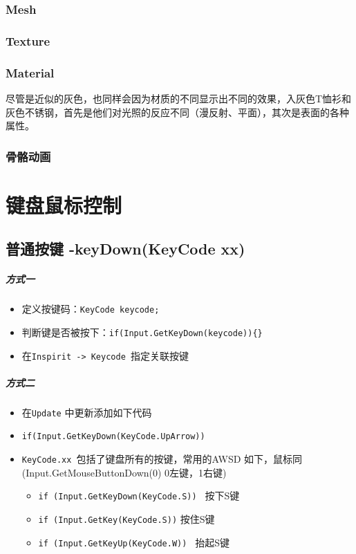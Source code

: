 \documentclass[UTF8,a4paper,12pt]{ctexbook}
\begin{document}
		\subsection{Mesh}
		
		\subsection{Texture}
				
		\subsection{Material}
			尽管是近似的灰色，也同样会因为材质的不同显示出不同的效果，入灰色T恤衫和灰色不锈钢，首先是他们对光照的反应不同（漫反射、平面），其次是表面的各种属性。
			
		\subsection{骨骼动画}
	
	
	
\chapter{键盘鼠标控制}
	\section{普通按键 -keyDown(KeyCode xx)}
		\paragraph{方式一}
		
			\begin{itemize}
				\item 定义按键码：\verb|KeyCode keycode;|
				\item 判断键是否被按下：\verb|if(Input.GetKeyDown(keycode)){}|
				\item 在\verb|Inspirit -> Keycode |指定关联按键
			\end{itemize}
	
		\paragraph{方式二}
			\begin{itemize}
				\item 在\verb|Update| 中更新添加如下代码
				\item \verb|if(Input.GetKeyDown(KeyCode.UpArrow))| 
				\item \verb|KeyCode.xx |包括了键盘所有的按键，常用的AWSD 如下，鼠标同(Input.GetMouseButtonDown(0) 0左键，1右键)
					\begin{itemize}
						\item \verb|if (Input.GetKeyDown(KeyCode.S)) | 按下S键
						\item \verb|if (Input.GetKey(KeyCode.S))| 按住S键
						\item \verb|if (Input.GetKeyUp(KeyCode.W)) | 抬起S键
					\end{itemize}
			\end{itemize}
		
\end{document}
